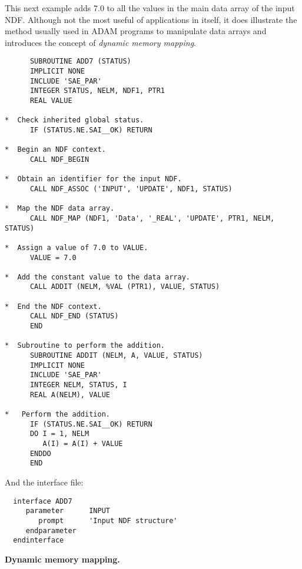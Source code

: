 This next example adds 7.0 to all the values in the main data array
of the input NDF.
Although not the most useful of applications in itself, it 
does illustrate the method usually used in ADAM programs to
manipulate data arrays and introduces the 
concept of {\sl dynamic memory mapping}.
\begin{verbatim}
      SUBROUTINE ADD7 (STATUS)                                
      IMPLICIT NONE
      INCLUDE 'SAE_PAR'                                       
      INTEGER STATUS, NELM, NDF1, PTR1
      REAL VALUE
    
*  Check inherited global status.
      IF (STATUS.NE.SAI__OK) RETURN

*  Begin an NDF context.    
      CALL NDF_BEGIN                                          
                                                              
*  Obtain an identifier for the input NDF.
      CALL NDF_ASSOC ('INPUT', 'UPDATE', NDF1, STATUS)           
                                                              
*  Map the NDF data array. 
      CALL NDF_MAP (NDF1, 'Data', '_REAL', 'UPDATE', PTR1, NELM, STATUS)
                                            
*  Assign a value of 7.0 to VALUE.
      VALUE = 7.0

*  Add the constant value to the data array. 
      CALL ADDIT (NELM, %VAL (PTR1), VALUE, STATUS)             

*  End the NDF context.                                       
      CALL NDF_END (STATUS)                                  
      END                                                     
                                                              
*  Subroutine to perform the addition.                        
      SUBROUTINE ADDIT (NELM, A, VALUE, STATUS)                 
      IMPLICIT NONE
      INCLUDE 'SAE_PAR'                                       
      INTEGER NELM, STATUS, I                                   
      REAL A(NELM), VALUE

*   Perform the addition.                     
      IF (STATUS.NE.SAI__OK) RETURN
      DO I = 1, NELM
         A(I) = A(I) + VALUE
      ENDDO
      END                                                     
\end{verbatim}
And the interface file:
\begin{verbatim}
  interface ADD7
     parameter      INPUT
        prompt      'Input NDF structure'
     endparameter
  endinterface
\end{verbatim}
\newpage
{\large\bf Dynamic memory mapping.}

